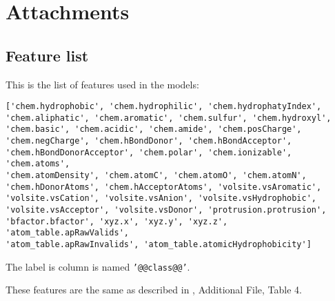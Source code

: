 \documentclass[12pt,a4paper]{report}
\let\openright=\clearpage
\begin{document}
\appendix
\chapter{Attachments}

\section{Feature list}
\label{feature_list}
This is the list of features used in the models:
\begin{lstlisting}
['chem.hydrophobic', 'chem.hydrophilic', 'chem.hydrophatyIndex',
'chem.aliphatic', 'chem.aromatic', 'chem.sulfur', 'chem.hydroxyl',
'chem.basic', 'chem.acidic', 'chem.amide', 'chem.posCharge',
'chem.negCharge', 'chem.hBondDonor', 'chem.hBondAcceptor',
'chem.hBondDonorAcceptor', 'chem.polar', 'chem.ionizable', 'chem.atoms',
'chem.atomDensity', 'chem.atomC', 'chem.atomO', 'chem.atomN',
'chem.hDonorAtoms', 'chem.hAcceptorAtoms', 'volsite.vsAromatic',
'volsite.vsCation', 'volsite.vsAnion', 'volsite.vsHydrophobic',
'volsite.vsAcceptor', 'volsite.vsDonor', 'protrusion.protrusion',
'bfactor.bfactor', 'xyz.x', 'xyz.y', 'xyz.z', 'atom_table.apRawValids',
'atom_table.apRawInvalids', 'atom_table.atomicHydrophobicity']
\end{lstlisting}
The label is column is named \texttt{'@@class@@'}.

These features are the same as described in \cite{P2RANK}, Additional File, Table 4.

\openright
\end{document}
